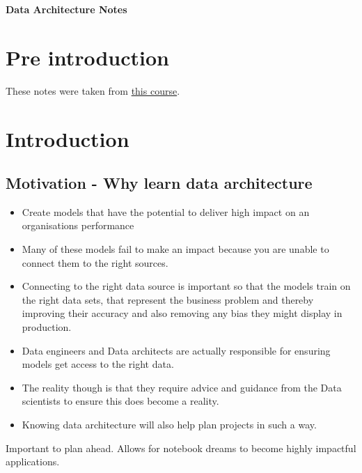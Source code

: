 \documentclass[a4paper, 11pt]{book}
\begin{document}
    \begin{titlepage}
        \centering
        \vspace*{2in}
        \Huge \textbf{Data Architecture Notes}
    \end{titlepage}

    \setcounter{section}{0}

    \newpage

    \tableofcontents
    \newpage

    \listoffigures
    \newpage


    \section{Pre introduction}
    These notes were taken from \href{https://www.udemy.com/course/data-architecture-for-data-scientists}{this course}.


    \section{Introduction}

    \subsection{Motivation - Why learn data architecture}
    \begin{itemize}
        \item Create models that have the potential to deliver high impact on an organisations performance
        \item Many of these models fail to make an impact because you are unable to connect them to the right sources.
        \item Connecting to the right data source is important so that the models train on the right data sets, that represent the business problem and thereby improving their accuracy and also removing any bias they might display in production.
        \item Data engineers and Data architects are actually responsible for ensuring models get access to the right data.
        \item The reality though is that they require advice and guidance from the Data scientists to ensure this does become a reality.
        \item Knowing data architecture will also help plan projects in such a way.
    \end{itemize}
    Important to plan ahead.
    Allows for notebook dreams to become highly impactful applications.
\end{document}
